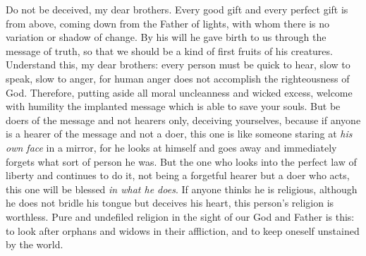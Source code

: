 \begin{biblechapter}
\verse Do not be deceived, my dear brothers.
\verse Every good gift and every perfect gift is from above, coming down from the Father of lights, with whom there is no variation or shadow of change.
\verse By his will he gave birth to us through the message of truth, so that we should be a kind of first fruits of his creatures.
 Understand this, my dear brothers: every person must be quick to hear, slow to speak, slow to anger,
\verse for human anger does not accomplish the righteousness of God.
\verse Therefore, putting aside all moral uncleanness and wicked excess, welcome with humility the implanted message which is able to save your souls.
\verse But be doers of the message and not hearers only, deceiving yourselves,
\verse because if anyone is a hearer of the message and not a doer, this one is like someone staring at \textit{his own face} in a mirror,
\verse for he looks at himself and goes away and immediately forgets what sort of person he was.
\verse But the one who looks into the perfect law of liberty and continues to do it, not being a forgetful hearer but a doer who acts, this one will be blessed \textit{in what he does}.
\verse If anyone thinks he is religious, although he does not bridle his tongue but deceives his heart, this person’s religion is worthless.
\verse Pure and undefiled religion in the sight of our God and Father is this: to look after orphans and widows in their affliction, and to keep oneself unstained by the world.
\end{biblechapter}

